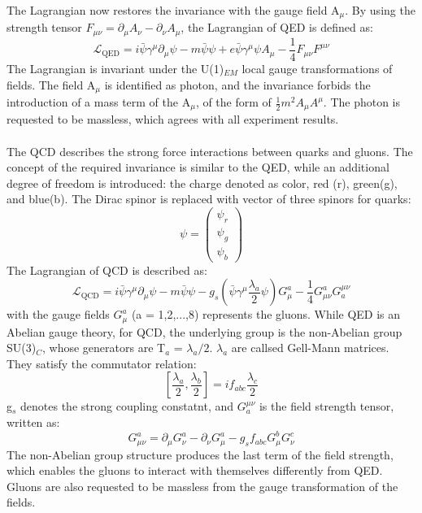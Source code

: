 The Lagrangian now restores the invariance with the gauge field A$_\mu$. By using the strength tensor $F_{\mu \nu}=\partial_{\mu} A_{\nu}-\partial_{\nu} A_{\mu}$, the Lagrangian of QED is defined as:
\begin{equation}
\label{eqn:QEDLagrangian}
\mathcal{L}_{\mathrm{QED}}=i \bar{\psi} \gamma^{\mu} \partial_{\mu} \psi-m \bar{\psi} \psi+e \bar{\psi} \gamma^{\mu} \psi A_{\mu}-\frac{1}{4} F_{\mu \nu} F^{\mu \nu}
\end{equation}
The Lagrangian is invariant under the U(1)$_{EM}$ local gauge transformations of fields. The field A$_\mu$ is identified as photon, and the invariance forbids the introduction of a mass term of the A$_\mu$, of the form of $\frac{1}{2}m^2 A_\mu A^\mu$. The photon is requested to be massless, which agrees with all experiment results.
\\

\noindent\textbf{} \\ 
The QCD describes the strong force interactions between quarks and gluons. The concept of the required invariance is similar to the QED, while an additional degree of freedom is introduced: the charge denoted as color, red (r), green(g), and blue(b). 
The Dirac spinor is replaced with vector of three spinors for quarks:
\begin{equation}
\psi=\left(\begin{array}{c}
\psi_{r} \\
\psi_{g} \\
\psi_{b}
\end{array}\right)
\end{equation}
The Lagrangian of QCD is described as:
\begin{equation}
\mathcal{L}_{\mathrm{QCD}}=i \bar{\psi} \gamma^{\mu} \partial_{\mu} \psi-m \bar{\psi} \psi-g_{s}\left(\bar{\psi} \gamma^{\mu} \frac{\lambda_{a}}{2} \psi\right) G_{\mu}^{a}-\frac{1}{4} G_{\mu \nu}^{a} G_{a}^{\mu \nu}
\end{equation}
with the gauge fields $G_{\mu}^{a}$ (a = 1,2,...,8) represents the gluons.
While QED is an Abelian gauge theory, for QCD, the underlying group is the non-Abelian group SU(3)$_C$, whose generators are T$_a$ = $\lambda_{a}/2$. $\lambda_{a}$ are callsed Gell-Mann matrices. They satisfy the commutator relation:
\begin{equation}
\left[\frac{\lambda_{a}}{2}, \frac{\lambda_{b}}{2}\right]=i f_{a b c} \frac{\lambda_{c}}{2}
\end{equation}
g$_s$ denotes the strong coupling constatnt, and $G_{a}^{\mu \nu}$ is the field strength tensor, written as:
\begin{equation}
G_{\mu \nu}^{a}=\partial_{\mu} G_{\nu}^{a}-\partial_{\nu} G_{\mu}^{a}-g_{s} f_{a b c} G_{\mu}^{b} G_{\nu}^{c}
\end{equation}
The non-Abelian group structure produces the last term of the field strength, which enables the gluons to interact with themselves differently from QED. Gluons are also requested to be massless from the gauge transformation of the fields.

